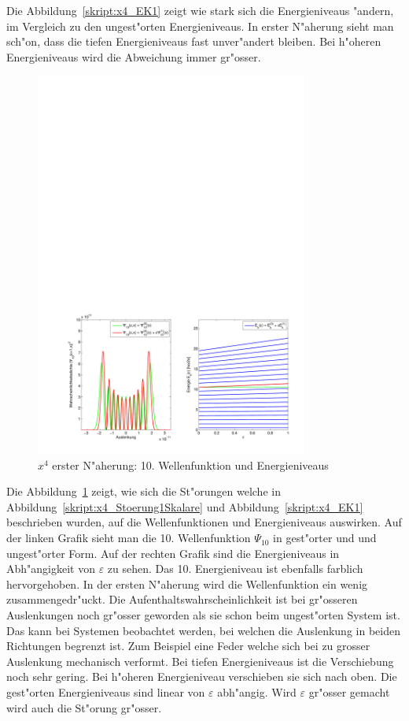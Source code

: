 \begin{refsection}
Die Abbildung~\ref{skript:x4_EK1} zeigt wie stark sich die Energieniveaus "andern,
im Vergleich zu den ungest"orten Energieniveaus.
In erster N"aherung sieht man sch"on, dass die tiefen Energieniveaus fast unver"andert
bleiben. Bei h"oheren Energieniveaus wird die Abweichung immer gr"osser.  

\begin{figure}	%
\centering
\includegraphics[width=0.8\textwidth]{anharmonisch/images/x4/Stoerung1Wellenfunktion.pdf}
\caption{$x^4$ erster N"aherung: 10. Wellenfunktion und Energieniveaus
\label{skript:x4_Stoerung1Wellenfunktion}}
\end{figure}

Die Abbildung~\ref{skript:x4_Stoerung1Wellenfunktion} zeigt,
wie sich die St"orungen welche in Abbildung~\ref{skript:x4_Stoerung1Skalare} und
Abbildung~\ref{skript:x4_EK1} beschrieben wurden, auf die Wellenfunktionen und
Energieniveaus auswirken.
Auf der linken Grafik sieht man die 10. Wellenfunktion $\Psi_{10}$ in gest"orter und
und ungest"orter Form.
Auf der rechten Grafik sind die Energieniveaus in Abh"angigkeit von $\varepsilon$
zu sehen.
Das 10. Energieniveau ist ebenfalls farblich hervorgehoben.
In der ersten N"aherung wird die Wellenfunktion ein wenig zusammengedr"uckt.
Die Aufenthaltswahrscheinlichkeit ist bei gr"osseren Auslenkungen noch gr"osser
geworden als sie schon beim ungest"orten System ist.
Das kann bei Systemen beobachtet werden, bei welchen die Auslenkung in beiden
Richtungen begrenzt ist.
Zum Beispiel eine Feder welche sich bei zu grosser Auslenkung mechanisch verformt.
Bei tiefen Energieniveaus ist die Verschiebung noch sehr gering.
Bei h"oheren Energieniveau verschieben sie sich nach oben.
Die gest"orten Energieniveaus sind linear von $\varepsilon$ abh"angig.
Wird $\varepsilon$ gr"osser gemacht wird auch die St"orung gr"osser.



\end{refsection}
